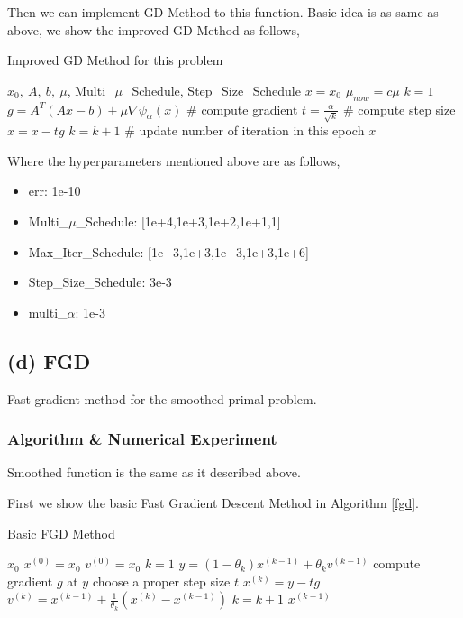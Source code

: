 \documentclass[]{article}
\begin{document}
 
Then we can implement GD Method to this function. Basic idea is as same as above, we show the improved GD Method as follows,

\begin{algorithm}[!h]
	\caption{Improved GD Method for this problem}
	\label{igd}
	\begin{algorithmic}
		\REQUIRE $x_0, \ A,\  b,\  \mu $, Multi\_$\mu$\_Schedule, Step\_Size\_Schedule
		\STATE $x=x_0$
		\STATE $\mu_{now} = c\mu$
		\STATE $k = 1$
		\STATE $g = A^T(Ax-b)+\mu \nabla \psi_{\alpha}(x)$ \# compute gradient
		\STATE $t = \frac{\alpha}{\sqrt{k}}$ \# compute step size
		\STATE $x=x-tg $
		\STATE $k = k + 1$ \# update number of iteration in this epoch
		\ENDWHILE
		\ENDFOR
		\ENSURE $x$
	\end{algorithmic}
\end{algorithm}

Where the hyperparameters mentioned above are as follows,

\begin{itemize}
	\item err: 1e-10
	\item Multi\_$\mu$\_Schedule: [1e+4,1e+3,1e+2,1e+1,1]
	\item Max\_Iter\_Schedule: [1e+3,1e+3,1e+3,1e+3,1e+6]
	\item Step\_Size\_Schedule: 3e-3
	\item multi\_$\alpha$: 1e-3
\end{itemize}

\subsection{(d) FGD}
\noindent
Fast gradient method for the smoothed primal problem.

\subsubsection{Algorithm \& Numerical Experiment}

Smoothed function is the same as it described above. 

First we show the basic Fast Gradient Descent Method in Algorithm \ref{fgd}.
\begin{algorithm}[!h]
	\caption{Basic FGD Method}
	\label{fgd}
	\begin{algorithmic}
		\REQUIRE $x_0$
		\STATE $x^{(0)}=x_0$
		\STATE $v^{(0)}=x_0$
		\STATE $k=1$
		\WHILE{Stop Conditions}
		\STATE $y=(1-\theta_k)x^{(k-1)} + \theta_k v^{(k-1)}$
		\STATE compute gradient $g$ at $y$
		\STATE choose a proper step size $t$
		\STATE $x^{(k)}=y-tg$
		\STATE $v^{(k)} = x^{(k-1)} + \frac{1}{\theta_k}(x^{(k)}-x^{(k-1)})$
		\STATE $k=k+1$
		\ENDWHILE
		\ENSURE $x^{(k-1)}$
	\end{algorithmic}
\end{algorithm}
\end{document}
